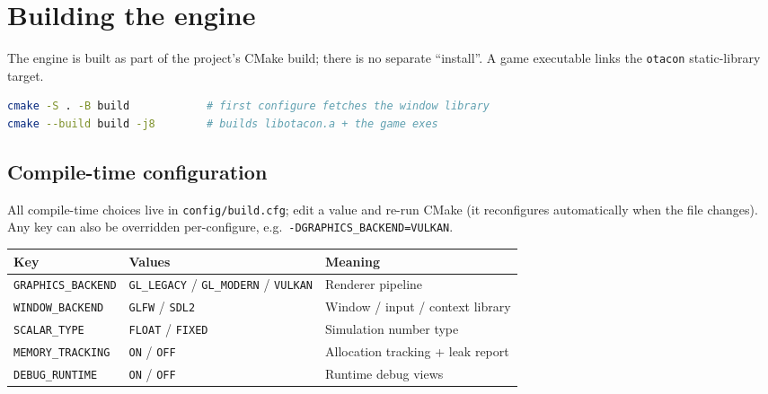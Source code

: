 \documentclass[11pt]{report}
\newcommand{\code}[1]{\texttt{#1}}
\begin{document}
\chapter{Building the engine}
The engine is built as part of the project's CMake build; there is no separate
``install''. A game executable links the \code{otacon} static-library target.

\begin{lstlisting}[language=bash]
cmake -S . -B build            # first configure fetches the window library
cmake --build build -j8        # builds libotacon.a + the game exes
\end{lstlisting}

\section{Compile-time configuration}
All compile-time choices live in \code{config/build.cfg}; edit a value and re-run
CMake (it reconfigures automatically when the file changes). Any key can also be
overridden per-configure, e.g.\ \code{-DGRAPHICS\_BACKEND=VULKAN}.

\begin{longtable}{lll}
\toprule
Key & Values & Meaning \\
\midrule
\endhead
\code{GRAPHICS\_BACKEND} & \code{GL\_LEGACY} / \code{GL\_MODERN} / \code{VULKAN} & Renderer pipeline \\
\code{WINDOW\_BACKEND}   & \code{GLFW} / \code{SDL2} & Window / input / context library \\
\code{SCALAR\_TYPE}      & \code{FLOAT} / \code{FIXED} & Simulation number type \\
\code{MEMORY\_TRACKING}  & \code{ON} / \code{OFF} & Allocation tracking + leak report \\
\code{DEBUG\_RUNTIME}    & \code{ON} / \code{OFF} & Runtime debug views \\
\bottomrule
\end{longtable}
\end{document}
